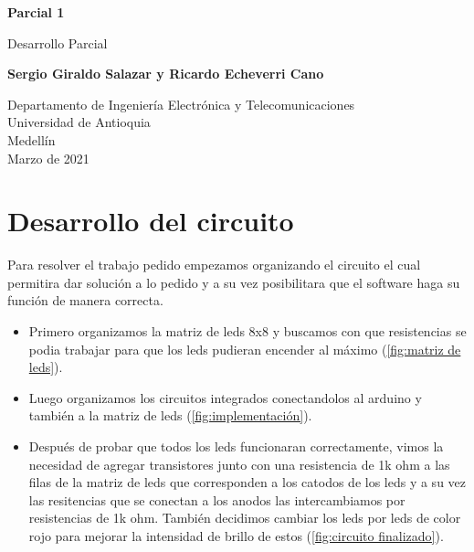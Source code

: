 \documentclass{article}
\begin{document}
\begin{titlepage}
    \begin{center}
        \vspace*{1cm}
            
        \Huge
        \textbf{Parcial 1}
            
        \vspace{0.5cm}
        \LARGE
        Desarrollo Parcial
            
        \vspace{1.5cm}
            
        \textbf{Sergio Giraldo Salazar y Ricardo Echeverri Cano}
            
        \vfill
            
        \vspace{0.8cm}
            
        \Large
        Departamento de Ingeniería Electrónica y Telecomunicaciones\\
        Universidad de Antioquia\\
        Medellín\\
        Marzo de 2021
            
    \end{center}
\end{titlepage}

\tableofcontents
\newpage
\section{Desarrollo del circuito}\label{Circuito}
Para resolver el trabajo pedido empezamos organizando el circuito el cual permitira dar solución a lo pedido y a su vez posibilitara que el software haga su función de manera correcta.

\begin{itemize}
    \item Primero organizamos la matriz de leds 8x8 y buscamos con que resistencias se podia trabajar para que los leds pudieran encender al máximo (\ref{fig:matriz de leds}).

    \item Luego organizamos los circuitos integrados conectandolos al arduino y también a la matriz de leds (\ref{fig:implementación}).
    \item Después de probar que todos los leds funcionaran correctamente, vimos la necesidad de agregar transistores junto con una resistencia de 1k ohm a las filas de la matriz de leds que corresponden a los catodos de los leds y a su vez las resitencias que se conectan a los anodos las intercambiamos por resistencias de 1k ohm.
    También decidimos cambiar los leds por leds de color rojo para mejorar la intensidad de brillo de estos (\ref{fig:circuito finalizado}).
\end{itemize}
\end{document}
